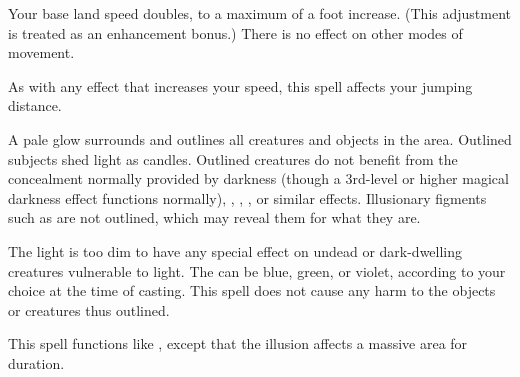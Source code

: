 \spellrng{\rngclose}
\begin{spelleffect}
  Your base land speed doubles, to a maximum of a  foot increase. (This adjustment is treated as an enhancement bonus.) There is no effect on other modes of movement.
\end{spelleffect}
\begin{spellnotes}
 As with any effect that increases your speed, this spell affects your jumping distance.
 \end{spellnotes}

\begin{comment}
\subsubsection{F}
\end{comment}

\spellrng{\rngmed}
\begin{spelleffect}
  A pale glow surrounds and outlines all creatures and objects in the area. Outlined subjects shed light as candles. Outlined creatures do not benefit from the concealment normally provided by darkness (though a 3rd-level or higher magical darkness effect functions normally), , , , or similar effects. Illusionary figments such as  are not outlined, which may reveal them for what they are.

  The light is too dim to have any special effect on undead or dark-dwelling creatures vulnerable to light. The  can be blue, green, or violet, according to your choice at the time of casting. This spell does not cause any harm to the objects or creatures thus outlined.
\end{spelleffect}

\begin{spelleffect}
    This spell functions like , except that the illusion affects a massive area for \durlong duration.
\end{spelleffect}


